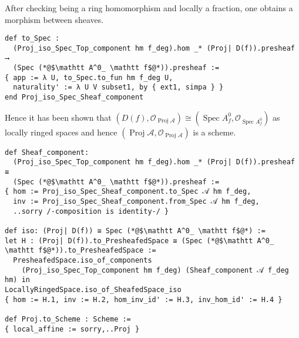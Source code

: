 \documentclass[a4paper,UKenglish,cleveref, autoref, thm-restate]{lipics-v2021}
\begin{document}
After checking being a ring homomorphism and locally a fraction, one obtains a morphism between sheaves.
\begin{lstlisting}
def to_Spec :
  (Proj_iso_Spec_Top_component hm f_deg).hom _* (Proj| D(f)).presheaf ⟶
  (Spec (*@$\mathtt A^0_ \mathtt f$@*)).presheaf :=
{ app := λ U, to_Spec.to_fun hm f_deg U,
  naturality' := λ U V subset1, by { ext1, simpa } }
end Proj_iso_Spec_Sheaf_component
\end{lstlisting}
Hence it has been shown that $(D(f), \mathcal{O}_{\operatorname{Proj}\mathcal A})\cong (\operatorname{Spec}A^0_f, \mathcal{O}_{\operatorname{Spec}A^0_f})$ as locally ringed spaces and hence $(\operatorname{Proj}\mathcal A, \mathcal{O}_{\operatorname{Proj}\mathcal A})$ is a scheme.
\begin{lstlisting}
def Sheaf_component:
  (Proj_iso_Spec_Top_component hm f_deg).hom _* (Proj| D(f)).presheaf ≅
  (Spec (*@$\mathtt A^0_ \mathtt f$@*)).presheaf :=
{ hom := Proj_iso_Spec_Sheaf_component.to_Spec 𝒜 hm f_deg,
  inv := Proj_iso_Spec_Sheaf_component.from_Spec 𝒜 hm f_deg,
  ..sorry /-composition is identity-/ }

def iso: (Proj| D(f)) ≅ Spec (*@$\mathtt A^0_ \mathtt f$@*) :=
let H : (Proj| D(f)).to_PresheafedSpace ≅ (Spec (*@$\mathtt A^0_ \mathtt f$@*)).to_PresheafedSpace :=
  PresheafedSpace.iso_of_components
    (Proj_iso_Spec_Top_component hm f_deg) (Sheaf_component 𝒜 f_deg hm) in
LocallyRingedSpace.iso_of_SheafedSpace_iso
{ hom := H.1, inv := H.2, hom_inv_id' := H.3, inv_hom_id' := H.4 }

def Proj.to_Scheme : Scheme :=
{ local_affine := sorry,..Proj }
\end{lstlisting}

\end{document}

